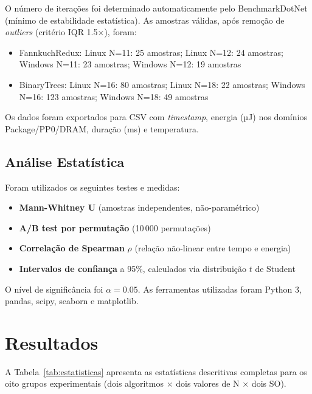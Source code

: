 \documentclass[12pt,a4paper]{article}
\begin{document}
O número de iterações foi determinado automaticamente pelo BenchmarkDotNet
(mínimo de estabilidade estatística).
As amostras válidas, após remoção de \textit{outliers} (critério IQR 1.5×),
foram:
\begin{itemize}
  \item FannkuchRedux: Linux N=11: 25 amostras; Linux N=12: 24 amostras;
    Windows N=11: 23 amostras; Windows N=12: 19 amostras
  \item BinaryTrees: Linux N=16: 80 amostras; Linux N=18: 22 amostras;
    Windows N=16: 123 amostras; Windows N=18: 49 amostras
\end{itemize}
Os dados foram exportados para CSV com \textit{timestamp}, energia (µJ) nos
domínios Package/PP0/DRAM, duração (ms) e temperatura.

\subsection{Análise Estatística}

Foram utilizados os seguintes testes e medidas:
\begin{itemize}
  \item \textbf{Mann-Whitney U} (amostras independentes, não-paramétrico)
  \item \textbf{A/B test por permutação} (10\,000 permutações)
  \item \textbf{Correlação de Spearman} $\rho$ (relação não-linear entre tempo
    e energia)
  \item \textbf{Intervalos de confiança} a 95\%, calculados via distribuição
    $t$ de Student
\end{itemize}
O nível de significância foi $\alpha = 0.05$.
As ferramentas utilizadas foram Python 3, pandas, scipy, seaborn e matplotlib.

\section{Resultados}
\label{sec:resultados}

A Tabela~\ref{tab:estatisticas} apresenta as estatísticas descritivas
completas para os oito grupos experimentais (dois algoritmos $\times$ dois
valores de N $\times$ dois SO).
\end{document}
